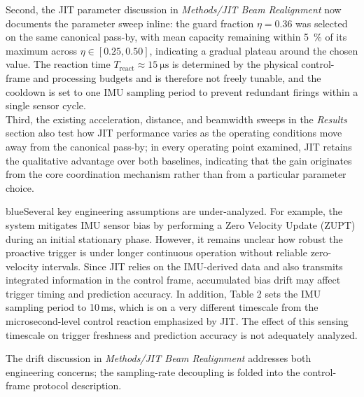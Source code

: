\documentclass{article}
\newcommand{\blue}[1]{\begin{color}{blue}#1\end{color}}
\begin{document}
\noindent Second, the JIT parameter discussion in \emph{Methods/JIT Beam Realignment} now documents the parameter sweep inline: the guard fraction $\eta = 0.36$ was selected on the same canonical pass-by, with mean capacity remaining within \SI{5}{\percent} of its maximum across $\eta \in [0.25, 0.50]$, indicating a gradual plateau around the chosen value. The reaction time $T_{\text{react}} \approx \SI{15}{\micro\second}$ is determined by the physical control-frame and processing budgets and is therefore not freely tunable, and the cooldown is set to one IMU sampling period to prevent redundant firings within a single sensor cycle.\\

\noindent Third, the existing acceleration, distance, and beamwidth sweeps in the \emph{Results} section also test how JIT performance varies as the operating conditions move away from the canonical pass-by; in every operating point examined, JIT retains the qualitative advantage over both baselines, indicating that the gain originates from the core coordination mechanism rather than from a particular parameter choice.

\begin{tcbremark}
{\selectfont
\blue{Several key engineering assumptions are under-analyzed. For example, the system mitigates IMU sensor bias by performing a Zero Velocity Update (ZUPT) during an initial stationary phase. However, it remains unclear how robust the proactive trigger is under longer continuous operation without reliable zero-velocity intervals. Since JIT relies on the IMU-derived data and also transmits integrated information in the control frame, accumulated bias drift may affect trigger timing and prediction accuracy. In addition, Table 2 sets the IMU sampling period to 10\,ms, which is on a very different timescale from the microsecond-level control reaction emphasized by JIT. The effect of this sensing timescale on trigger freshness and prediction accuracy is not adequately analyzed.}
}
\end{tcbremark}

\noindent The drift discussion in \emph{Methods/JIT Beam Realignment} addresses both engineering concerns; the sampling-rate decoupling is folded into the control-frame protocol description.\\
\end{document}

